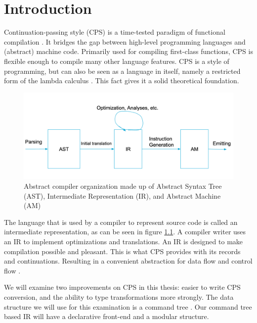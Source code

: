 
\chapter{\label{chap:introduction}Introduction}

Continuation-passing style (CPS) is a time-tested paradigm of functional compilation \autocite{steele1978rabbit, DBLP:books/daglib/0022396}. It bridges the gap between high-level programming languages and (abstract) machine code. Primarily used for compiling first-class functions, CPS is flexible enough to compile many other language features. CPS is a style of programming, but can also be seen as a language in itself, namely a restricted form of the lambda calculus \autocite{barendregt1984lambda}. This fact gives it a solid theoretical foundation.

\begin{figure}
\includegraphics[width=1\textwidth]{./img/compiler_organisation.png}
\caption{Abstract compiler organization made up of Abstract Syntax Tree (AST), Intermediate Representation (IR), and Abstract Machine (AM)}
\label{fig:comporg}
\end{figure}

The language that is used by a compiler to represent source code is called an intermediate representation, as can be seen in figure \ref{fig:comporg}. A compiler writer uses an IR to implement optimizations and translations. An IR is designed to make compilation possible and pleasant. This is what CPS provides with its records and continuations. Resulting in a convenient abstraction for data flow and control flow \autocite{bruin2020framevm}. 

We will examine two improvements on CPS in this thesis: easier to write CPS conversion, and the ability to type transformations more strongly. The data structure we will use for this examination is a command tree \autocite{commandtreespoulsen}. Our command tree based IR will have a declarative front-end and a modular structure.


